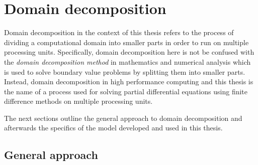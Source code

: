 \section{Domain decomposition}
% 
% 
Domain decomposition in the context of this thesis refers to the process of dividing a computational domain into smaller parts in order to run on multiple processing units.
Specifically, domain decomposition here is not be confused with the \textit{domain decomposition method} in mathematics and numerical analysis which is used to solve boundary value problems by splitting them into smaller parts.
Instead, domain decomposition in high performance computing and this thesis is the name of a process used for solving partial differential equations using finite difference methods on multiple processing units.

The next sections outline the general approach to domain decomposition and afterwards the specifics of the model developed and used in this thesis.

\subsection{General approach}



